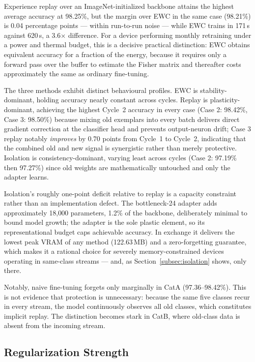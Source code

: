 \documentclass[journal]{IEEEtran}
\begin{document}
Experience replay over an ImageNet-initialized backbone attains the highest average
accuracy at 98.25\%, but the margin over EWC in the same case (98.21\%) is 0.04
percentage points --- within run-to-run noise --- while EWC trains in 171\,s against
620\,s, a 3.6$\times$ difference. For a device performing monthly retraining under a
power and thermal budget, this is a decisive practical distinction: EWC obtains
equivalent accuracy for a fraction of the energy, because it requires only a forward
pass over the buffer to estimate the Fisher matrix and thereafter costs approximately
the same as ordinary fine-tuning.

The three methods exhibit distinct behavioural profiles. EWC is stability-dominant,
holding accuracy nearly constant across cycles. Replay is plasticity-dominant,
achieving the highest Cycle~2 accuracy in every case (Case 2: 98.42\%, Case 3:
98.50\%) because mixing old exemplars into every batch delivers direct gradient
correction at the classifier head and prevents output-neuron drift; Case 3 replay
notably \emph{improves} by 0.70 points from Cycle~1 to Cycle~2, indicating that the
combined old and new signal is synergistic rather than merely protective. Isolation
is consistency-dominant, varying least across cycles (Case 2: 97.19\% then 97.27\%)
since old weights are mathematically untouched and only the adapter learns.

Isolation's roughly one-point deficit relative to replay is a capacity constraint
rather than an implementation defect. The bottleneck-24 adapter adds approximately
18{,}000 parameters, 1.2\% of the backbone, deliberately minimal to bound model
growth; the adapter is the sole plastic element, so its representational budget caps
achievable accuracy. In exchange it delivers the lowest peak VRAM of any method
(122.63\,MB) and a zero-forgetting guarantee, which makes it a rational choice for
severely memory-constrained devices operating in same-class streams --- and, as
Section~\ref{subsec:isolation} shows, only there.

Notably, naive fine-tuning forgets only marginally in CatA (97.36--98.42\%). This is
not evidence that protection is unnecessary: because the same five classes recur in
every stream, the model continuously observes all old classes, which constitutes
implicit replay. The distinction becomes stark in CatB, where old-class data is
absent from the incoming stream.

\subsection{Regularization Strength}
\label{subsec:lambda}
\end{document}
